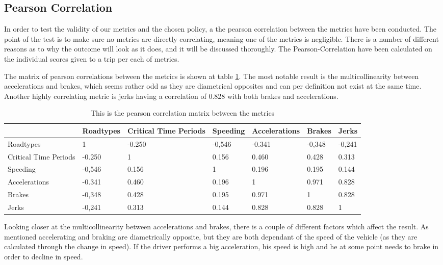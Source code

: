 \subsection{Pearson Correlation}\label{subsec:pearsoncorrelation}

In order to test the validity of our metrics and the chosen policy, a the pearson correlation between the metrics have been conducted. The point of the test is to make sure no metrics are directly correlating, meaning one of the metrics is negligible. There is a number of different reasons as to why the outcome will look as it does, and it will be discussed thoroughly. The Pearson-Correlation have been calculated on the individual scores given to a trip per each of metrics. 

The matrix of pearson correlations between the metrics is shown at table \ref{tab:pearsonmatrix}. The most notable result is the multicollinearity between accelerations and brakes, which seems rather odd as they are diametrical opposites and can per definition not exist at the same time. Another highly correlating metric is jerks having a correlation of 0.828 with both brakes and accelerations. 

\begin{table}[tb]
\centering
\caption{This is the pearson correlation matrix between the metrics}
\label{tab:pearsonmatrix}
\begin{tabular}{l|llllll}
                      & Roadtypes & Critical Time Periods & Speeding & Accelerations & Brakes & Jerks  \\ \hline
Roadtypes             & 1         & -0.250                & -0,546   & -0.341        & -0,348 & -0,241 \\
Critical Time Periods & -0.250    & 1                     & 0.156    & 0.460         & 0.428  & 0.313  \\
Speeding              & -0,546    & 0.156                 & 1        & 0.196         & 0.195  & 0.144  \\
Accelerations         & -0.341    & 0.460                 & 0.196    & 1             & 0.971  & 0.828  \\
Brakes                & -0,348    & 0.428                 & 0.195    & 0.971         & 1      & 0.828  \\
Jerks                 & -0,241    & 0.313                 & 0.144    & 0.828         & 0.828  & 1     
\end{tabular}
\end{table}

Looking closer at the multicollinearity between accelerations and brakes, there is a couple of different factors which affect the result. As mentioned accelerating and braking are diametrically opposite, but they are both dependant of the speed of the vehicle (as they are calculated through the change in speed). If the driver performs a big acceleration, his speed is high and he at some point needs to brake in order to decline in speed. 

